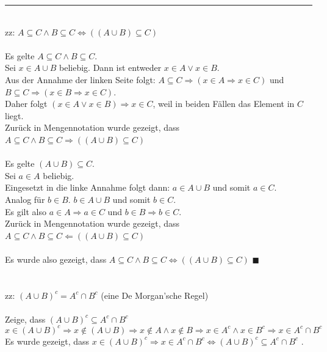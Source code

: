 \documentclass{article}
\begin{document}
{\color{blue}
\hrule
	\\
	zz: $A\subseteq C \wedge B\subseteq C \Leftrightarrow ((A\cup B)\subseteq C)$\\
	\\
	\fbox{$\Rightarrow$} Es gelte $A\subseteq C \wedge B\subseteq C$.\\
	Sei $x\in A\cup B$ beliebig. Dann ist entweder $x\in A \vee x\in B$.\\
	Aus der Annahme der linken Seite folgt: $A\subseteq C \Rightarrow (x\in A \Rightarrow x\in C)$ und $B\subseteq C \Rightarrow (x\in B \Rightarrow x\in C)$.\\
	Daher folgt $(x\in A \vee x\in B) \Rightarrow x\in C$, weil in beiden Fällen das Element in $C$ liegt.\\
	Zurück in Mengennotation wurde gezeigt, dass $A\subseteq C \wedge B\subseteq C \Rightarrow ((A\cup B) \subseteq C)$ \checkmark\\
	\\
	\fbox{$\Leftarrow$} Es gelte $(A\cup B) \subseteq C$.\\
	Sei $a\in A$ beliebig.\\
	Eingesetzt in die linke Annahme folgt dann: $a\in A\cup B$ und somit $a\in C$.\\
	Analog für $b\in B$. $b\in A\cup B$ und somit $b\in C$.\\
	Es gilt also $a\in A\Rightarrow a\in C$ und $b\in B \Rightarrow b\in C$.\\
	Zurück in Mengennotation wurde gezeigt, dass $A\subseteq C \wedge B\subseteq C \Leftarrow ((A\cup B) \subseteq C)$ \checkmark\\
	\\
	Es wurde also gezeigt, dass $A\subseteq C \wedge B\subseteq C \Leftrightarrow ((A\cup B)\subseteq C)$ \hfill $\blacksquare$\\
	\\
	\\
	zz: $(A\cup B)^c = A^c \cap B^c$ (eine De Morgan'sche Regel)\\
	\\
	\fbox{$\subseteq$} Zeige, dass $(A\cup B)^c \subseteq A^c \cap B^c$
		$$x\in (A\cup B)^c \Rightarrow x\notin (A\cup B) \Rightarrow x\notin A \wedge x\notin B \Rightarrow x\in A^c \wedge x\in B^c \Rightarrow x\in A^c \cap B^c$$
		Es wurde gezeigt, dass $x\in (A\cup B)^c \Rightarrow x\in A^c\cap B^c \Leftrightarrow (A\cup B)^c \subseteq A^c\cap B^c$ \checkmark.\\
	\\
}
\end{document}
